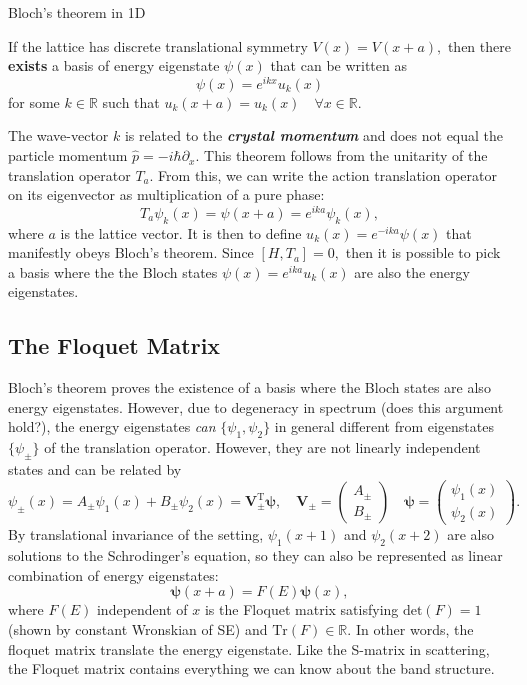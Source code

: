 \documentclass{article}
\theoremstyle{nonumberplain}
\begin{document}
\begin{frm-thm}{Bloch's theorem in 1D}

    If the lattice has discrete translational symmetry $V(x) = V(x+a),$  then there \textbf{exists} a basis of energy eigenstate $\psi(x)$ that can be written as 
    \[
        \psi(x) = e^{i k x} u_k(x)
    \]
    for some $k \in \mathbb{R} $ such that $u_k(x+a) = u_k(x) \quad \forall x \in \mathbb{R}.$
\end{frm-thm}
The wave-vector $k$ is related to the \textit{\textbf{crystal momentum}} and does not equal the particle momentum $\hat{p} = -i \hbar \partial_x .$ This theorem follows from the unitarity of the translation operator $T_a. $ From this, we can write the action translation operator on its eigenvector as multiplication of a pure phase:
\[
    T_a \psi_k(x) = \psi(x+a) = e^{i k a} \psi_k(x),
\]
where $a$ is the lattice vector. It is then to define $u_k(x) = e^{-ika} \psi(x)$ that manifestly obeys Bloch's theorem. Since $[H, T_a] = 0,$ then it is possible to pick a basis where the the Bloch states $\psi(x) = e^{i k a} u_k(x)$ are also the energy eigenstates. 

\subsection{The Floquet Matrix}
Bloch's theorem proves the existence of a basis where the Bloch states are also energy eigenstates. However, due to degeneracy in spectrum (does this argument hold?), the energy eigenstates \textit{can} $\{\psi_1, \psi_2\}$ in general different from eigenstates $\{\psi_\pm\}$ of the translation operator. However, they are not linearly independent states and can be related by 
\[
    \psi_\pm(x) = A_\pm \psi_1(x) + B_\pm \psi_2(x) = \mathbf{V}_\pm^{\mathrm{T}} \boldsymbol{\mathbf{\psi}}  , \quad 
    \mathbf{V}_{\pm} = \begin{pmatrix} A_\pm \\ B_\pm \end{pmatrix} \quad 
    \boldsymbol{\mathbf{\psi}} = \begin{pmatrix} \psi_1(x) \\ \psi_2(x) \end{pmatrix}.
\]
By translational invariance of the setting, $\psi_1(x+1)$ and $\psi_2(x+2)$ are also solutions to the Schrodinger's equation, so they can also be represented as linear combination of energy eigenstates:
\[\boxed{
    \boldsymbol{\mathbf{\psi}}(x+a)
     = F(E) 
     \boldsymbol{\mathbf{\psi}}(x), }
\]
where $F(E)$ independent of $x$ is the Floquet matrix satisfying $\boxed{\mathrm{det}(F) = 1 }$ (shown by constant Wronskian of SE) and $\mathrm{Tr}(F) \in \mathbb{R}. $ In other words, the floquet matrix translate the energy eigenstate. Like the S-matrix in scattering, the Floquet matrix contains everything we can know about the band structure. 
\end{document}
